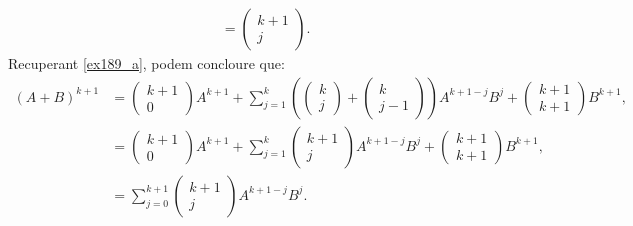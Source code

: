 \begin{exercise}[1.8.9]
\begin{solution}
\begin{align}
        &=\begin{pmatrix} k+1 \\j \end{pmatrix} .
    \end{align}
    Recuperant \eqref{ex189_a}, podem concloure que:
    \begin{align}
    (A+B)^{k+1}&= \begin{pmatrix} k+1 \\0 \end{pmatrix}A^{k+1}+ \sum_{j=1}^k \left(\begin{pmatrix} k \\j \end{pmatrix} +\begin{pmatrix} k \\j-1 \end{pmatrix}\right) A^{k+1-j}B^{j}+\begin{pmatrix} k+1 \\k+1 \end{pmatrix}B^{k+1} ,\\
    &= \begin{pmatrix} k+1 \\0 \end{pmatrix}A^{k+1}+ \sum_{j=1}^k \begin{pmatrix} k+1 \\j \end{pmatrix}  A^{k+1-j}B^{j}+\begin{pmatrix} k+1 \\k+1 \end{pmatrix}B^{k+1} ,\\
    &= \sum_{j=0}^{k+1} \begin{pmatrix} k+1 \\j \end{pmatrix}  A^{k+1-j}B^{j}.
\end{align}


\end{solution}
\end{exercise}